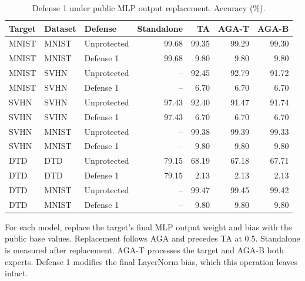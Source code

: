 \begin{table}[t]
\centering\small
\setlength{\tabcolsep}{4pt}
\caption{Defense 1 under public MLP output replacement. Accuracy (\%).}
\label{tab:defense1_B_replacement}
\begin{tabular}{@{}lllrrrr@{}}
\toprule
Target & Dataset & Defense & Standalone & TA & AGA-T & AGA-B \\
\midrule
MNIST & MNIST & Unprotected & 99.68 & 99.35 & 99.29 & 99.30 \\
MNIST & MNIST & Defense 1 & 99.68 & 9.80 & 9.80 & 9.80 \\
MNIST & SVHN & Unprotected & -- & 92.45 & 92.79 & 91.72 \\
MNIST & SVHN & Defense 1 & -- & 6.70 & 6.70 & 6.70 \\
\midrule
SVHN & SVHN & Unprotected & 97.43 & 92.40 & 91.47 & 91.74 \\
SVHN & SVHN & Defense 1 & 97.43 & 6.70 & 6.70 & 6.70 \\
SVHN & MNIST & Unprotected & -- & 99.38 & 99.39 & 99.33 \\
SVHN & MNIST & Defense 1 & -- & 9.80 & 9.80 & 9.80 \\
\midrule
DTD & DTD & Unprotected & 79.15 & 68.19 & 67.18 & 67.71 \\
DTD & DTD & Defense 1 & 79.15 & 2.13 & 2.13 & 2.13 \\
DTD & MNIST & Unprotected & -- & 99.47 & 99.45 & 99.42 \\
DTD & MNIST & Defense 1 & -- & 9.80 & 9.80 & 9.80 \\
\bottomrule
\end{tabular}
\par\smallskip
\begin{minipage}{\textwidth}\footnotesize For each model, replace the target's final MLP output weight and bias with the public base values. Replacement follows AGA and precedes TA at 0.5. Standalone is measured after replacement. AGA-T processes the target and AGA-B both experts. Defense 1 modifies the final LayerNorm bias, which this operation leaves intact.\end{minipage}
\end{table}
